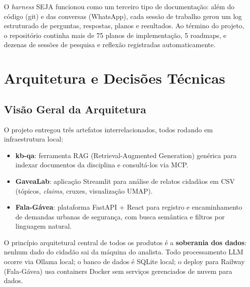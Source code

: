 \documentclass[12pt,a4paper]{article}
\begin{document}
O \textit{harness} SEJA funcionou como um terceiro tipo de documentação: além do código
(git) e das conversas (WhatsApp), cada sessão de trabalho gerou um log estruturado de
perguntas, respostas, planos e resultados. Ao término do projeto, o repositório continha
mais de 75 planos de implementação, 5 roadmaps, e dezenas de sessões de pesquisa e
reflexão registradas automaticamente.


\section{Arquitetura e Decisões Técnicas}

\subsection{Visão Geral da Arquitetura}

O projeto entregou três artefatos interrelacionados, todos rodando em infraestrutura
local:

\begin{itemize}
  \item \textbf{kb-qa}: ferramenta RAG (Retrieval-Augmented Generation) genérica para
    indexar documentos da disciplina e consultá-los via MCP.
  \item \textbf{GaveaLab}: aplicação Streamlit para análise de relatos cidadãos em CSV
    (tópicos, \textit{claims}, cruxes, visualização UMAP).
  \item \textbf{Fala-Gávea}: plataforma FastAPI + React para registro e encaminhamento
    de demandas urbanas de segurança, com busca semântica e filtros por linguagem
    natural.
\end{itemize}

O princípio arquitetural central de todos os produtos é a \textbf{soberania dos dados}:
nenhum dado do cidadão sai da máquina do analista. Todo processamento LLM ocorre via
Ollama local; o banco de dados é SQLite local; o deploy para Railway (Fala-Gávea) usa
containers Docker sem serviços gerenciados de nuvem para dados.

\end{document}
